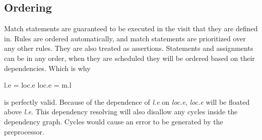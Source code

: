 \subsection{Ordering}
Match statements are guaranteed to be executed in the visit that they are defined in. Rules are ordered automatically, and match statements are prioritized over any other rules. They are also treated as assertions. Statements and assignments can be in any order, when they are scheduled they will be ordered based on their dependencies. Which is why

\begin{code}
l.e = loc.e
loc.e = m.l
\end{code}

is perfectly valid. Because of the dependence of \emph{l.e} on \emph{loc.e}, \emph{loc.e} will be floated above \emph{l.e}. This dependency resolving will also disallow any cycles inside the dependency graph. Cycles would cause an error to be generated by the preprocessor.
